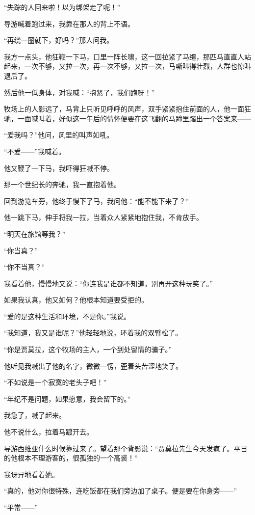 \par “失踪的人回来啦！以为绑架走了呢！”
\par 导游喊着跑过来，我靠在那人的背上不语。
\par “再绕一圈就下，好吗？”那人问我。
\par 我方一点头，他狂鞭一下马，口里一阵长啸，这一回拉紧了马缰，那匹马直直人站起来，一次不够，又拉一次，再一次不够，又拉一次，马嘶叫得壮烈，人群也惊叫退后了。
\par 然后他一低身体，对我喊：“抱紧了，我们跑呀！”
\par 牧场上的人影远了，马背上只听见呼呼的风声，双手紧紧抱住前面的人，他一面狂驰，一面喊叫着，好似这一午后的情怀便要在这飞翻的马蹄里踏出一个答案来——
\par “爱我吗？”他问，风里的叫声如吼。
\par “不爱——”我喊着。
\par 他又鞭了一下马，我吓得狂喊不停。
\par 那一个世纪长的奔驰，我一直抱着他。
\par 回到游览车旁，他终于慢下了马，我问他：“能不能下来了？”
\par 他一跳下马，伸手将我一拉，当着众人紧紧地抱住我，不肯放手。
\par “明天在旅馆等我？”
\par “你当真？”
\par “你不当真？”
\par 我看着他，慢慢地又说：“你连我是谁都不知道，别再开这种玩笑了。”
\par 如果我认真，他又如何？他根本知道要受拒的。
\par “爱的是这种生活和环境，不是你。”我说。
\par “我知道，我又是谁呢？”他轻轻地说，环着我的双臂松了。
\par “你是贾莫拉，这个牧场的主人，一个到处留情的骗子。”
\par 他听见我喊出了他的名字，微微一愣，歪着头苦涩地笑了。
\par “不如说是一个寂寞的老头子吧！”
\par “年纪不是问题，如果愿意，我会留下的。”
\par 我急了，喊了起来。
\par 他不说什么，拉着马踱开去。
\par 导游西维亚什么时候靠过来了。望着那个背影说：“贾莫拉先生今天发疯了。平日的他根本不理游客的，很孤独的一个高裘！”
\par 我讶异地看着她。
\par “真的，他对你很特殊，连吃饭都在我们旁边加了桌子。便是要在你身旁——”
\par “平常——”
